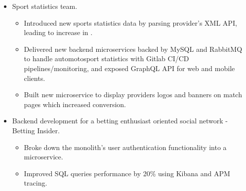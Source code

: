 \begin{itemize}
    \item Sport statistics team. 
        \begin{itemize}
            \item Introduced new sports statistics data by parsing provider's XML API, leading to increase in .
            \item Delivered new backend microservices backed by MySQL and RabbitMQ to handle automotosport statistics 
                    with Gitlab CI/CD pipelines/monitoring, and exposed GraphQL API for web and mobile clients. 
            \item Built new microservice to display providers logos and banners on match pages which increased conversion.
        \end{itemize}
    \item Backend development for a betting enthusiast oriented social network - Betting Insider. 
        \begin{itemize}
            \item Broke down the monolith's user authentication functionality into a microservice.
            \item Improved SQL queries performance by 20\% using Kibana and APM tracing.
        \end{itemize} 
\end{itemize}
